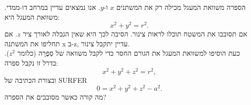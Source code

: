 \begin{surferPage}[Sphere]{הספרה}
משוואת המעגל מכילה רק את המשתנים $x$ ו-$y$. אנו נמצאים עדיין במרחב דו-ממדי.
משוואת המעגל היא:
\[x^2+y^2=r^2.\]
אם תסובבו את המשטח תוכלו לראות צינור. הסיבה לכך היא שאין הגבלה לאורך ציר $z$. אם תחליפו את המשתנה x ב-z, עדיין יתקבל צינור.\\
כעת הוסיפו למשוואת המעגל את הגורם החסר כדי לקבל משוואה של סְפֶרָה (כלומר $z^2$). 
בדרל זו נקבל ספרה:
\[x^2+y^2+z^2=r^2,\]
ובצורת הכתיבה של SURFER
\[0=x^2+y^2+z^2-a^2.\]
מה קורה כאשר מסובבים את הספרה?
\end{surferPage}
